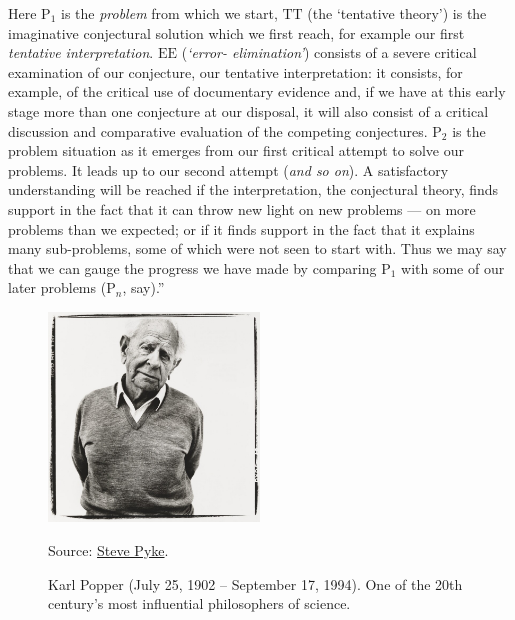 \documentclass[
12pt,
openright,
oneside,
a4paper,
chapter=TITLE,
section=TITLE,
french,
spanish,
brazil,
english
]{abntex2}\usepackage{array}
\renewcommand{\ABNTEXfontereduzida}{\footnotesize}
\renewcommand{\legend}[1]{
  \addvspace{0.75\baselineskip}
  \ABNTEXfontereduzida \raggedright #1
}
\begin{document}
Here \(\text{P}_{1}\) is the \emph{problem} from which we start,
\(\text{TT}\) (the `tentative theory') is the imaginative conjectural
solution which we first reach, for example our first \emph{tentative
interpretation}. \(\text{EE}\) (\emph{`error- elimination'}) consists of
a severe critical examination of our conjecture, our tentative
interpretation: it consists, for example, of the critical use of
documentary evidence and, if we have at this early stage more than one
conjecture at our disposal, it will also consist of a critical
discussion and comparative evaluation of the competing conjectures.
\(\text{P}_{2}\) is the problem situation as it emerges from our first
critical attempt to solve our problems. It leads up to our second
attempt (\emph{and so on}). A satisfactory understanding will be reached
if the interpretation, the conjectural theory, finds support in the fact
that it can throw new light on new problems --- on more problems than we
expected; or if it finds support in the fact that it explains many
sub-problems, some of which were not seen to start with. Thus we may say
that we can gauge the progress we have made by comparing
\(\text{P}_{1}\) with some of our later problems (\(\text{P}_{n}\),
say).''

\vspace{15pt}

\noindent \hspace*{\fill} \autocite[p.~164]{popper1979}

\begin{figure}[H]
  \caption{
    \label{fig-karl-popper}
    Karl Popper (July 25, 1902 – September 17, 1994).\linebreak
    One of the 20th century's most influential philosophers of science.
  }

  \centering
  \includegraphics[width=0.5\textwidth]{images/karl-popper.png}

  \legend{Source: \href{https://www.npg.org.uk/collections/search/portrait/mw08238/Sir-Karl-Raimund-Popper?}{Steve Pyke}.}
\end{figure}
\end{document}

